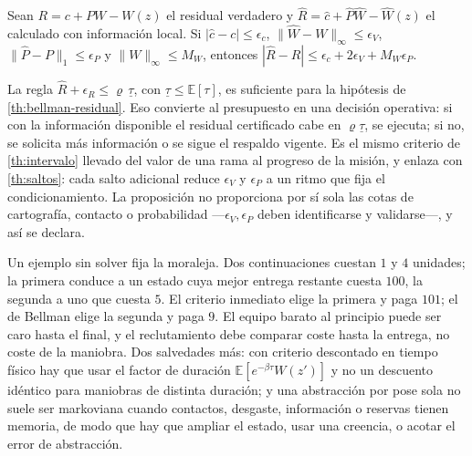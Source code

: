\begin{proposicion}
\label{pr:presupuesto-error}
Sean $R=c+PW-W(z)$ el residual verdadero y $\hat R=\hat c+\hat P\hat W-\hat W(z)$
el calculado con información local. Si $|\hat c-c|\le\epsilon_c$,
$\lVert\hat W-W\rVert_\infty\le\epsilon_V$, $\lVert\hat P-P\rVert_1\le\epsilon_P$ y
$\lVert W\rVert_\infty\le M_W$, entonces
$|\hat R-R|\le\epsilon_c+2\epsilon_V+M_W\epsilon_P$.
\end{proposicion}

\begin{observacion}
\label{obs:presupuesto-uso}
La regla $\hat R+\epsilon_R\le\varrho\,\underline\tau$, con
$\underline\tau\le\mathbb E[\tau]$, es suficiente para la hipótesis de
\cref{th:bellman-residual}. Eso convierte al presupuesto en una decisión
operativa: si con la información disponible el residual certificado cabe en
$\varrho\underline\tau$, se ejecuta; si no, se solicita más información o se
sigue el respaldo vigente. Es el mismo criterio de \cref{th:intervalo} llevado
del valor de una rama al progreso de la misión, y enlaza con \cref{th:saltos}:
cada salto adicional reduce $\epsilon_V$ y $\epsilon_P$ a un ritmo que fija el
condicionamiento. La proposición no proporciona por sí sola las cotas de
cartografía, contacto o probabilidad —$\epsilon_V,\epsilon_P$ deben
identificarse y validarse—, y así se declara.
\end{observacion}

\begin{observacion}
\label{obs:equipo-barato}
Un ejemplo sin solver fija la moraleja. Dos continuaciones cuestan $1$ y $4$
unidades; la primera conduce a un estado cuya mejor entrega restante cuesta
$100$, la segunda a uno que cuesta $5$. El criterio inmediato elige la primera y
paga $101$; el de Bellman elige la segunda y paga $9$. El equipo barato al
principio puede ser caro hasta el final, y el reclutamiento debe comparar
coste hasta la entrega, no coste de la maniobra. Dos salvedades más: con
criterio descontado en tiempo físico hay que usar el factor de duración
$\mathbb E[e^{-\beta\tau}W(z')]$ y no un descuento idéntico para maniobras de
distinta duración; y una abstracción por pose sola no suele ser markoviana
cuando contactos, desgaste, información o reservas tienen memoria, de modo que
hay que ampliar el estado, usar una creencia, o acotar el error de abstracción.
\end{observacion}


